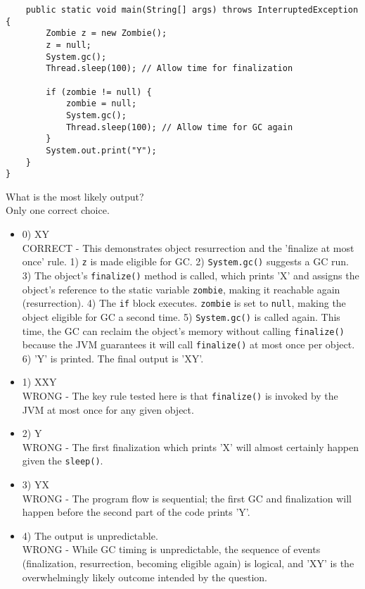\documentclass[12pt]{article}
\begin{document}
\begin{enumerate}[label=(\arabic*)]
\begin{verbatim}
    public static void main(String[] args) throws InterruptedException {
        Zombie z = new Zombie();
        z = null;
        System.gc();
        Thread.sleep(100); // Allow time for finalization

        if (zombie != null) {
            zombie = null;
            System.gc();
            Thread.sleep(100); // Allow time for GC again
        }
        System.out.print("Y");
    }
}
\end{verbatim}
What is the most likely output?
\\ \noindent Only one correct choice. 
\begin{itemize}
\item 0) XY
 \\ 
CORRECT - This demonstrates object resurrection and the 'finalize at most once' rule. 1) \verb|z| is made eligible for GC. 2) \verb|System.gc()| suggests a GC run. 3) The object's \verb|finalize()| method is called, which prints 'X' and assigns the object's reference to the static variable \verb|zombie|, making it reachable again (resurrection). 4) The \verb|if| block executes. \verb|zombie| is set to \verb|null|, making the object eligible for GC a second time. 5) \verb|System.gc()| is called again. This time, the GC can reclaim the object's memory without calling \verb|finalize()| because the JVM guarantees it will call \verb|finalize()| at most once per object. 6) 'Y' is printed. The final output is 'XY'.

\item 1) XXY
 \\ 
WRONG - The key rule tested here is that \verb|finalize()| is invoked by the JVM at most once for any given object.

\item 2) Y
 \\ 
WRONG - The first finalization which prints 'X' will almost certainly happen given the \verb|sleep()|.

\item 3) YX
 \\ 
WRONG - The program flow is sequential; the first GC and finalization will happen before the second part of the code prints 'Y'.

\item 4) The output is unpredictable.
 \\ 
WRONG - While GC timing is unpredictable, the sequence of events (finalization, resurrection, becoming eligible again) is logical, and 'XY' is the overwhelmingly likely outcome intended by the question.


\end{itemize}
\end{enumerate}
\end{document}
